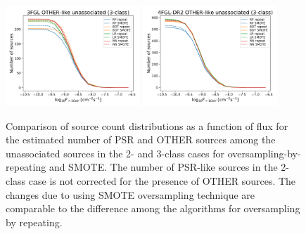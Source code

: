 \begin{figure}[h]
\hspace*{-0.5cm}
\includegraphics[width=0.45\textwidth]{plots/oversample/N_logS_3FGL_OTHER_3classes_O_vs_S.pdf}
\hspace*{-0.5cm}
\includegraphics[width=0.45\textwidth]{plots/oversample/N_logS_4FGL-DR2_OTHER_3classes_O_vs_S.pdf}
\caption{Comparison of source count distributions as a function of flux for the estimated number of PSR and OTHER sources
among the unassociated sources in the 2- and 3-class cases for oversampling-by-repeating and SMOTE.
The number of PSR-like sources in the 2-class case is not corrected for the presence of OTHER sources.
The changes due to using SMOTE oversampling technique are comparable to the difference among the algorithms
for oversampling by repeating.
}
\label{fig:S_vs_O_NlogS}
\end{figure}
